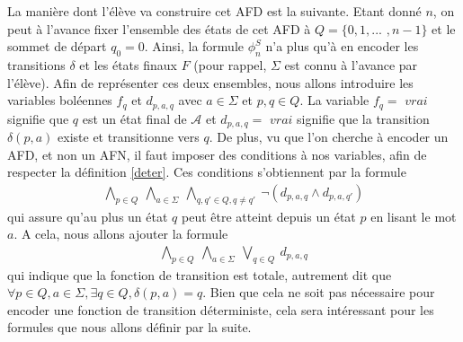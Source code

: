 \documentclass[12pt,a4paper,oneside,titlepage]{report}
\begin{document}
\noindent La manière dont l'élève va construire cet AFD est la suivante. Etant donné $n$, on peut à l'avance fixer l'ensemble des états de cet AFD  à $Q=\{0,1,...$ $,n-1\}$ et le sommet de départ $q_0=0$. Ainsi, la formule $\phi^S_n$ n'a plus qu'à en encoder les transitions $\delta$ et les états finaux $F$ (pour rappel, $\Sigma$ est connu à l'avance par l'élève). Afin de représenter ces deux ensembles, nous allons introduire les variables boléennes $f_q$ et $d_{p,a,q}$ avec $a\in\Sigma$ et $p,q\in Q$. La variable $f_q=$ $vrai$ signifie que $q$ est un état final de $\mathcal{A}$ et $d_{p,a,q}=$ $vrai$ signifie que la transition $\delta(p,a)$ existe et transitionne vers $q$. De plus, vu que l'on cherche à encoder un AFD, et non un AFN, il faut imposer des conditions à nos variables, afin de respecter la définition \ref{deter}. Ces conditions s'obtiennent par la formule
\begin{equation}
\label{booldeter1}
\begin{aligned} \bigwedge _{p \in Q}~ \bigwedge _{a \in \varSigma }~ \bigwedge _{q, q' \in Q, q \ne q'}~ \neg (d_{p, a, q} \land d_{p, a, q'}) \end{aligned}
\end{equation}
qui assure qu'au plus un état $q$ peut être atteint depuis un état $p$ en lisant le mot $a$. A cela, nous allons ajouter la formule 
\begin{equation}
\label{booldeter2}
\begin{aligned} \bigwedge _{p \in Q}~ \bigwedge _{a \in \varSigma }~ \bigvee _{q \in Q}~ d_{p, a, q} \end{aligned}
\end{equation}
qui indique que la fonction de transition est totale, autrement dit que $\forall p\in Q, a\in\Sigma, \exists q\in Q, \delta(p,a)=q$. Bien que cela ne soit pas nécessaire pour encoder une fonction de transition déterministe, cela sera intéressant pour les formules que nous allons définir par la suite.
\end{document}
